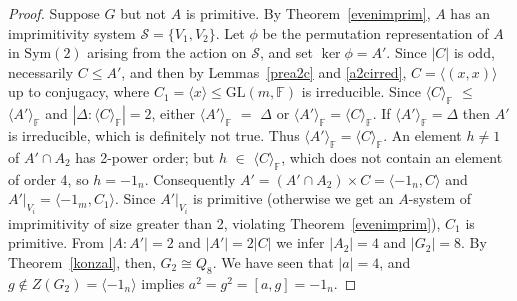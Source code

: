 \documentclass[10pt,a4paper]{amsart}
\begin{document}
\begin{proof}
 Suppose $G$ but not $A$ is primitive.
 By Theorem~\ref{evenimprim},
 $A$ has an imprimitivity system $\mathcal{S} = \{ V_1, V_2 \}$.
 Let $\phi$ be the permutation representation of $A$ in 
 $\mathrm{Sym}(2)$ arising from the action on $\mathcal{S}$, 
 and set $\ker \phi=A'$.
 Since $|C|$ is odd, necessarily $C \leq A'$, 
and then by
 Lemmas~\ref{prea2c} and \ref{a2cirred},
 $C = \langle (x,x) \rangle$ up to conjugacy,
 where $C_1 = \langle x \rangle \leq \mathrm{GL}(m, \mathbb{F})$ 
 is irreducible. Since $\langle C\rangle_\mathbb{F}$ $\leq$
 $\langle A'\rangle_\mathbb{F}$
 and $|\Delta : \langle C\rangle_\mathbb{F}| =2$, 
 either $\langle A' \rangle_\mathbb{F}$ $=$ 
 $\Delta$ or $\langle A'\rangle_\mathbb{F} = 
 \langle C\rangle_\mathbb{F}$. 
 If $\langle A' \rangle_\mathbb{F} = 
 \Delta$ then $A'$ is irreducible, 
 which is definitely not true.
 Thus $\langle A'\rangle_\mathbb{F} = 
 \langle C\rangle_\mathbb{F}$.    
 An element $h\neq 1$ of $A' \cap A_2$ has 2-power order;
 but $h$ $\in$  $\langle C\rangle_\mathbb{F}$, which
 does not contain an element of order 4, so $h = -1_n$. 
 Consequently 
 $A' = (A' \cap A_2)\times C = \langle -1_n, C \rangle$ and 
 $A'|_{V_i} = \langle -1_m, C_1 \rangle$. Since 
 $A'|_{V_i}$ is primitive (otherwise we get an $A$-system of
 imprimitivity of size greater than 2, violating 
 Theorem~\ref{evenimprim}), $C_1$ is primitive.
 From $|A: A'|=2$ and $|A'| = 2|C|$ we infer $|A_2| =4$
 and $|G_2|=8$. 
 By Theorem~\ref{konzal}, then, $G_2 \cong Q_8$.
 We have seen that $|a|=4$, and 
 $g \notin Z(G_2) = \langle -1_n \rangle$
 implies 
 $a^2=g^2= [a,g] = -1_n$.


\end{proof}
\end{document}
